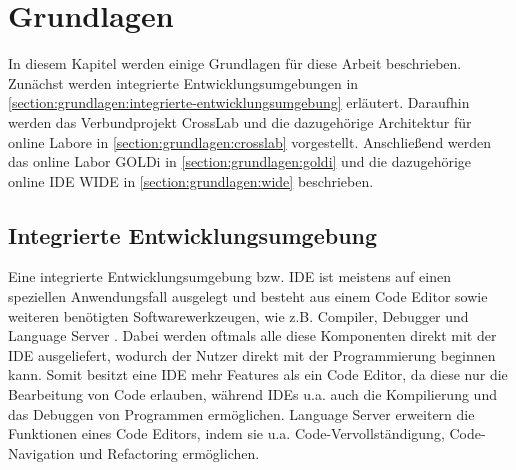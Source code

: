 \chapter{Grundlagen}\label{section:grundlagen}

In diesem Kapitel werden einige Grundlagen für diese Arbeit beschrieben. Zunächst werden integrierte Entwicklungsumgebungen in \autoref{section:grundlagen:integrierte-entwicklungsumgebung} erläutert. Daraufhin werden das Verbundprojekt CrossLab und die dazugehörige Architektur für online Labore in \autoref{section:grundlagen:crosslab} vorgestellt. Anschließend werden das online Labor GOLDi in \autoref{section:grundlagen:goldi} und die dazugehörige online IDE WIDE in \autoref{section:grundlagen:wide} beschrieben.

\section{Integrierte Entwicklungsumgebung}\label{section:grundlagen:integrierte-entwicklungsumgebung}
Eine integrierte Entwicklungsumgebung bzw. \ac{IDE} ist meistens auf einen speziellen Anwendungsfall ausgelegt und besteht aus einem Code Editor sowie weiteren benötigten Softwarewerkzeugen, wie z.B. Compiler, Debugger und Language Server \cite{noauthor_language-server-protocol_nodate}. Dabei werden oftmals alle diese Komponenten direkt mit der \ac{IDE} ausgeliefert, wodurch der Nutzer direkt mit der Programmierung beginnen kann. Somit besitzt eine \ac{IDE} mehr Features als ein Code Editor, da diese nur die Bearbeitung von Code erlauben, während \acp{IDE} u.a. auch die Kompilierung und das Debuggen von Programmen ermöglichen. Language Server erweitern die Funktionen eines Code Editors, indem sie u.a. Code-Vervollständigung, Code-Navigation und Refactoring ermöglichen.

